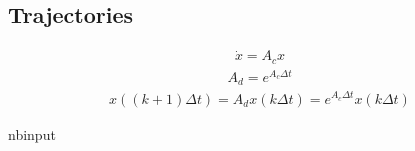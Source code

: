 \documentclass[letterpaper,10pt,english]{sphinxmanual}
\begin{document}
\subsection{Trajectories}
\label{\detokenize{examples/05_MIMO_Event:Trajectories}}\begin{equation*}
\begin{split}\dot{x} = A_{c}x\end{split}
\end{equation*}\begin{equation*}
\begin{split}A_{d} = e^{A_{c}\Delta t}\end{split}
\end{equation*}\begin{equation*}
\begin{split}x\left((k+1)\Delta t\right) = A_{d}x(k\Delta t) = e^{A_{c}\Delta t}x(k\Delta t)\end{split}
\end{equation*}
\begin{sphinxuseclass}{nbinput}
{
\begin{sphinxVerbatim}[commandchars=\\\{\}]
\llap{\color{nbsphinxin}[16]:\,\hspace{\fboxrule}\hspace{\fboxsep}}  \PYG{p}{[}\PYG{p}{[}\PYG{p}{]}\PYG{p}{[}\PYG{p}{]}\PYG{p}{]}
  \PYG{p}{[}\PYG{p}{[}\PYG{p}{]}\PYG{p}{[}\PYG{p}{]}\PYG{p}{]}
  \PYG{p}{[}\PYG{p}{[}\PYG{p}{]}\PYG{p}{[}\PYG{p}{]}\PYG{p}{]}

   
\end{sphinxVerbatim}
}

\end{sphinxuseclass}
\end{document}
